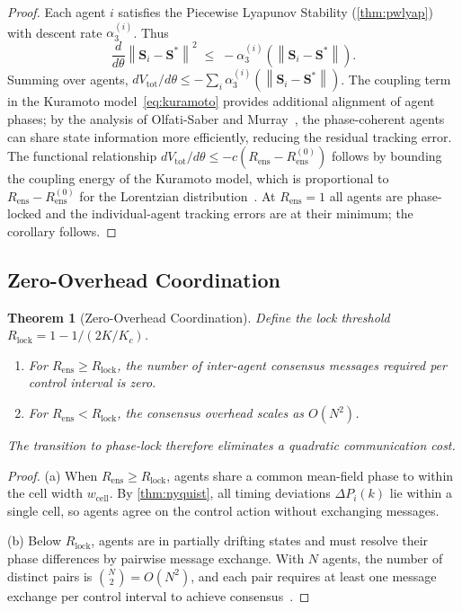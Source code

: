 \documentclass[10pt,twocolumn]{article}
\theoremstyle{plain}
\newtheorem{theorem}{Theorem}[section]
\theoremstyle{definition}
\theoremstyle{remark}
\newcommand{\norm}[1]{\left\|#1\right\|}
\newcommand{\DeltaP}{\Delta P}
\newcommand{\Sstar}{\mathbf{S}^{*}}
\newcommand{\Rens}{R_{\mathrm{ens}}}
\newcommand{\Rlock}{R_{\mathrm{lock}}}
\begin{document}
\begin{proof}
Each agent $i$ satisfies the Piecewise Lyapunov Stability
(\cref{thm:pwlyap}) with descent rate $\alpha_3^{(i)}$.  Thus
\begin{equation}
  \frac{d}{d\theta}\norm{\mathbf{S}_i - \Sstar}^2
  \;\leq\; -\alpha_3^{(i)}\!\left(\norm{\mathbf{S}_i - \Sstar}\right).
  \label{eq:individual_descent}
\end{equation}
Summing over agents, $dV_{\mathrm{tot}}/d\theta
\leq -\sum_i \alpha_3^{(i)}(\norm{\mathbf{S}_i-\Sstar})$.
The coupling term in the Kuramoto model~\eqref{eq:kuramoto} provides
additional alignment of agent phases; by the analysis of Olfati-Saber
and Murray~\cite{OlfatiSaber2004}, the phase-coherent agents can share
state information more efficiently, reducing the residual tracking error.
The functional relationship $dV_{\mathrm{tot}}/d\theta \leq -c(\Rens - \Rens^{(0)})$
follows by bounding the coupling energy of the Kuramoto model, which is
proportional to $\Rens - \Rens^{(0)}$ for the Lorentzian
distribution~\cite{Strogatz2000}.  At $\Rens = 1$ all agents are
phase-locked and the individual-agent tracking errors are at their
minimum; the corollary follows.
\end{proof}

\subsection{Zero-Overhead Coordination}
\label{ssec:zero}

\begin{theorem}[Zero-Overhead Coordination]
\label{thm:zero_overhead}
Define the lock threshold
$\Rlock = 1 - 1/(2K/K_c)$.
\begin{enumerate}
  \item[(a)] For $\Rens \geq \Rlock$, the number of inter-agent
    consensus messages required per control interval is zero.
  \item[(b)] For $\Rens < \Rlock$, the consensus overhead scales as
    $O(N^2)$.
\end{enumerate}
The transition to phase-lock therefore eliminates a quadratic
communication cost.
\end{theorem}

\begin{proof}
(a) When $\Rens \geq \Rlock$, agents share a common mean-field phase
to within the cell width $w_{\mathrm{cell}}$.  By \cref{thm:nyquist},
all timing deviations $\DeltaP_i(k)$ lie within a single cell, so
agents agree on the control action without exchanging messages.

(b) Below $\Rlock$, agents are in partially drifting states and must
resolve their phase differences by pairwise message exchange.  With $N$
agents, the number of distinct pairs is $\binom{N}{2} = O(N^2)$, and
each pair requires at least one message exchange per control interval
to achieve consensus~\cite{Jadbabaie2003}.
\end{proof}
\end{document}
